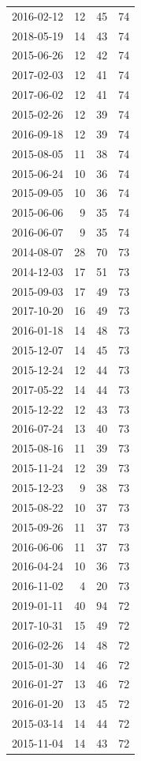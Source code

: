 \begin{tabular}{lrrr}
2016-02-12 & 12 & 45 & 74 \\
2018-05-19 & 14 & 43 & 74 \\
2015-06-26 & 12 & 42 & 74 \\
2017-02-03 & 12 & 41 & 74 \\
2017-06-02 & 12 & 41 & 74 \\
2015-02-26 & 12 & 39 & 74 \\
2016-09-18 & 12 & 39 & 74 \\
2015-08-05 & 11 & 38 & 74 \\
2015-06-24 & 10 & 36 & 74 \\
2015-09-05 & 10 & 36 & 74 \\
2015-06-06 & 9 & 35 & 74 \\
2016-06-07 & 9 & 35 & 74 \\
2014-08-07 & 28 & 70 & 73 \\
2014-12-03 & 17 & 51 & 73 \\
2015-09-03 & 17 & 49 & 73 \\
2017-10-20 & 16 & 49 & 73 \\
2016-01-18 & 14 & 48 & 73 \\
2015-12-07 & 14 & 45 & 73 \\
2015-12-24 & 12 & 44 & 73 \\
2017-05-22 & 14 & 44 & 73 \\
2015-12-22 & 12 & 43 & 73 \\
2016-07-24 & 13 & 40 & 73 \\
2015-08-16 & 11 & 39 & 73 \\
2015-11-24 & 12 & 39 & 73 \\
2015-12-23 & 9 & 38 & 73 \\
2015-08-22 & 10 & 37 & 73 \\
2015-09-26 & 11 & 37 & 73 \\
2016-06-06 & 11 & 37 & 73 \\
2016-04-24 & 10 & 36 & 73 \\
2016-11-02 & 4 & 20 & 73 \\
2019-01-11 & 40 & 94 & 72 \\
2017-10-31 & 15 & 49 & 72 \\
2016-02-26 & 14 & 48 & 72 \\
2015-01-30 & 14 & 46 & 72 \\
2016-01-27 & 13 & 46 & 72 \\
2016-01-20 & 13 & 45 & 72 \\
2015-03-14 & 14 & 44 & 72 \\
2015-11-04 & 14 & 43 & 72 \\

\end{tabular}

